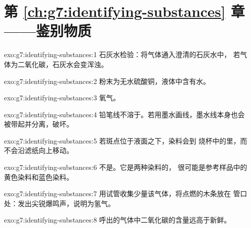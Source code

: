 \section*{第 \ref{ch:g7:identifying-substances} 章——鉴别物质}

\begin{solution}{exo:g7:identifying-substances:1}
石灰水检验：将气体通入澄清的石灰水中，
若气体为二氧化碳，石灰水会变浑浊。
\end{solution}

\begin{solution}{exo:g7:identifying-substances:2}
粉末为无水硫酸铜，液体中含有水。
\end{solution}

\begin{solution}{exo:g7:identifying-substances:3}
氧气。
\end{solution}

\begin{solution}{exo:g7:identifying-substances:4}
铅笔线不溶于。若用墨水画线，墨水线本身也会
被带起并分离，破坏。
\end{solution}

\begin{solution}{exo:g7:identifying-substances:5}
若斑点位于液面之下，染料会到
烧杯中的里，而不会沿滤纸向上移动。
\end{solution}

\begin{solution}{exo:g7:identifying-substances:6}
不是。它是两种染料的，
很可能是参考样品中的黄色染料和蓝色染料。
\end{solution}

\begin{solution}{exo:g7:identifying-substances:7}
用试管收集少量该气体，将点燃的木条放在
管口处：发出尖锐爆鸣声，说明为氢气。
\end{solution}

\begin{solution}{exo:g7:identifying-substances:8}
呼出的气体中二氧化碳的含量远高于新鲜。
\end{solution}

